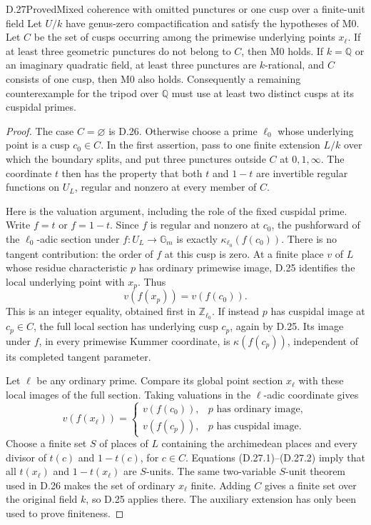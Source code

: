 \begin{statement}{D.27}{Proved}{Mixed coherence with omitted punctures or one cusp over a finite-unit field}
Let \(U/k\) have genus-zero compactification
and satisfy the hypotheses of M0. Let
\(C\) be the set of cusps occurring among
the primewise underlying points \(x_\ell\).
If at least three geometric punctures
do not belong to \(C\), then M0 holds.
If \(k=\mathbb Q\) or an imaginary
quadratic field, at least three punctures
are \(k\)-rational, and \(C\) consists
of one cusp, then M0 also holds.
Consequently a remaining counterexample
for the tripod over \(\mathbb Q\) must
use at least two distinct cusps at its
cuspidal primes.
\end{statement}
\begin{proof}
The case \(C=\varnothing\) is D.26.
Otherwise choose a prime \(\ell_0\)
whose underlying point is a cusp
\(c_0\in C\). In the first assertion,
pass to one finite extension \(L/k\)
over which the boundary splits, and
put three punctures outside \(C\) at
\(0,1,\infty\). The coordinate \(t\)
then has the property that both \(t\)
and \(1-t\) are invertible regular
functions on \(U_L\), regular and
nonzero at every member of \(C\).

Here is the valuation argument, including
the role of the fixed cuspidal prime.
Write \(f=t\) or \(f=1-t\). Since
\(f\) is regular and nonzero at \(c_0\),
the pushforward of the \(\ell_0\)-adic
section under \(f:U_L\to\mathbb G_m\)
is exactly \(\kappa_{\ell_0}(f(c_0))\).
There is no tangent contribution: the
order of \(f\) at this cusp is zero.
At a finite place \(v\) of \(L\) whose
residue characteristic \(p\) has ordinary
primewise image, D.25 identifies the local
underlying point with \(x_p\). Thus
\[
              v(f(x_p))=v(f(c_0)).              \tag{D.27.1}
\]
This is an integer equality, obtained
first in \(\mathbb Z_{\ell_0}\).
If instead \(p\) has cuspidal image
at \(c_p\in C\), the full local section
has underlying cusp \(c_p\), again by
D.25. Its image under \(f\), in every
primewise Kummer coordinate, is
\(\kappa(f(c_p))\), independent of its
completed tangent parameter.

Let \(\ell\) be any ordinary prime.
Compare its global point section
\(x_\ell\) with these local images of
the full section. Taking valuations
in the \(\ell\)-adic coordinate gives
\[
 v(f(x_\ell))=
 \begin{cases}
 v(f(c_0)),&p\text{ has ordinary image},\\
 v(f(c_p)),&p\text{ has cuspidal image}.
 \end{cases}                                   \tag{D.27.2}
\]
Choose a finite set \(S\) of places of
\(L\) containing the archimedean places
and every divisor of \(t(c)\) and
\(1-t(c)\), for \(c\in C\). Equations
(D.27.1)--(D.27.2) imply that all
\(t(x_\ell)\) and \(1-t(x_\ell)\)
are \(S\)-units. The same two-variable
\(S\)-unit theorem used in D.26 makes
the set of ordinary \(x_\ell\) finite.
Adding \(C\) gives a finite set over
the original field \(k\), so D.25
applies there. The auxiliary extension
has only been used to prove finiteness.


\end{proof}
